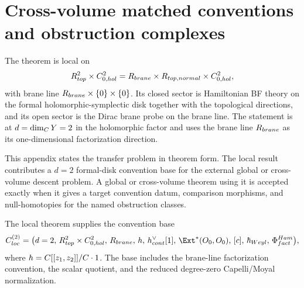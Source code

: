 %
%

\section{Cross-volume matched conventions and obstruction complexes}\label{app:convention-contract}

The theorem is local on
\[
  R^2_{top}\times C^2_{0,hol}
  =
  R_{brane}\times R_{top,normal}
  \times C^2_{0,hol},
\]
with brane line \(R_{brane}\times\{0\}\times\{0\}\). Its
closed sector is Hamiltonian BF theory on the formal
holomorphic-symplectic disk together with the topological directions, and
its open sector is the Dirac brane probe on the brane line. The statement
is at \(d=\dim_{C} Y=2\) in the holomorphic factor and uses the brane line
\(R_{brane}\) as its one-dimensional factorization direction.

This appendix states the transfer problem in theorem form.  The local
result contributes a \(d=2\) formal-disk convention base for the
external global or cross-volume descent problem.  A global or
cross-volume theorem using it is accepted exactly when it gives a target
convention datum, comparison morphisms, and null-homotopies for the
named obstruction classes.

\begin{defn}\label{defn:local-hamiltonian-convention-base}
  The local theorem supplies the convention base
  \[
  \mathfrak C_{\mathrm{loc}}^{(2)}=
  \bigl(
    d=2,\,
    \R^2_{\mathrm{top}}\times\widehat{\C^2}_{0,\mathrm{hol}},\,
    \R_{\mathrm{brane}},\,
    \widehat{\mathfrak h},\,
    \widehat{\mathfrak h}^{\vee}_{\mathrm{cont}}[1],\,
    \Ext^*(\mc O_0,\mc O_0),\,
    [\bar c],\,
    \hbar_{\mathrm{Weyl}},\,
    \Phi^{\mathrm{Ham}}_{\mathrm{fact}}
  \bigr),
  \]
  where
  \(h=C[[z_1,z_2]]/C\cdot 1\).  The base includes
  the brane-line factorization convention, the scalar quotient, and the
  reduced degree-zero Capelli/Moyal normalization.
\end{defn}

